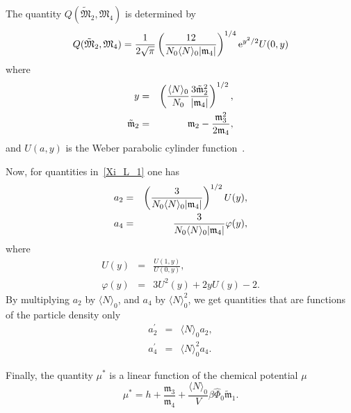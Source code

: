 The quantity $Q(\tilde{\mathfrak{M}}_2, \mathfrak{M}_4)$ is determined by
\begin{equation*}
	\label{quantity_Q}
	Q(\tilde{\mathfrak{M}}_2, \mathfrak{M}_4) = \frac{1}{2\sqrt{\pi}} \left(\frac{12}{N_0 \langle N \rangle_0\abs{\mathfrak{m}_4}}\right)^{1/4} {\rm e}^{y^2/2} U(0,y)
\end{equation*}
where
\begin{eqnarray*}
	y & = & \left(\frac{\langle N \rangle_0}{N_0} \frac{3\tilde{\mathfrak{m}}_2^2}{\abs{\mathfrak{m}_4}}\right)^{1/2},
	\\
	\tilde{\mathfrak{m}}_2 & = & \mathfrak{m}_2 - \frac{\mathfrak{m}_3^2}{2\mathfrak{m}_4},
\end{eqnarray*}
and $U(a, y)$ is the Weber parabolic cylinder function~\cite{nistMathFuncHandbook2010}.

Now, for quantities in~\eqref{Xi_L_1} one has
\begin{eqnarray*}
	a_2 & = & \left(\frac{3}{N_0 \langle N \rangle_0 \abs{\mathfrak{m}_4}}\right)^{1/2} U(y),
	\\
	a_4 & = & \frac{3}{N_0 \langle N \rangle_0 \abs{\mathfrak{m}_4}} \varphi(y),
\end{eqnarray*}
where
\begin{eqnarray*}
	U(y) & = & \frac{U(1,y)}{U(0,y)},
	\\
	\varphi(y) & = & 3U^2(y) + 2yU(y) -2.
\end{eqnarray*}
By multiplying $a_2$ by $\langle N \rangle_0$, and $a_4$ by $\langle N \rangle_0^2$, we get quantities that are functions of the particle density only
\begin{eqnarray*}
	a_2^{'} & = & \langle N \rangle_0 a_2,
	\\
	a_4^{'} & = & \langle N \rangle_0^2 a_4.
\end{eqnarray*}

Finally, the quantity $\mu^*$ is a linear function of the chemical potential $\mu$
\begin{equation*}
	\mu^* = h + \frac{\mathfrak{m}_3}{\mathfrak{m}_4} + \frac{\langle N \rangle_0}{V} \beta\hat{\Phi}_0 \tilde{\mathfrak{m}}_1.
\end{equation*}